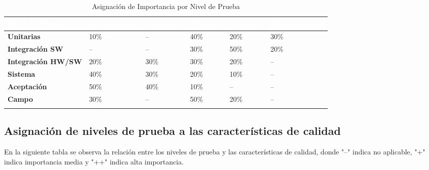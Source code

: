 \documentclass[12pt,a4paper, twosite]{article}
\begin{document}
\begin{longtable}{|p{3cm}|p{2cm}|p{2cm}|p{2cm}|p{2cm}|p{2cm}|}
  \hline
  \cellcolor[HTML]{4472C4}\textcolor{white}{\textbf{Nivel de Prueba}} & \cellcolor[HTML]{4472C4}\textcolor{white}{\textbf{Funcionalidad}} & \cellcolor[HTML]{4472C4}\textcolor{white}{\textbf{Usabilidad}} & \cellcolor[HTML]{4472C4}\textcolor{white}{\textbf{Precisión}} & \cellcolor[HTML]{4472C4}\textcolor{white}{\textbf{Eficiencia}} & \cellcolor[HTML]{4472C4}\textcolor{white}{\textbf{Mantenibilidad}} \\ \hline
  \textbf{Unitarias}          & 10\%  & –    & 40\%  & 20\%  & 30\%  \\ \hline
  \textbf{Integración SW}     & –     & –    & 30\%  & 50\%  & 20\%  \\ \hline
  \textbf{Integración HW/SW}  & 20\%  & 30\% & 30\%  & 20\%  & –     \\ \hline
  \textbf{Sistema}            & 40\%  & 30\% & 20\%  & 10\%  & –     \\ \hline
  \textbf{Aceptación}         & 50\%  & 40\% & 10\%  & –     & –     \\ \hline
  \textbf{Campo}              & 30\%  & –    & 50\%  & 20\%  & –     \\ \hline
  \caption{Asignación de Importancia por Nivel de Prueba} \label{tab:asignacion_importancia_prueba} \\
\end{longtable}

\subsection{Asignación de niveles de prueba a las características de calidad}
En la siguiente tabla se observa la relación entre los niveles de prueba y las características de calidad, donde "--" indica no aplicable, "+" indica importancia media y "++" indica alta importancia.
\end{document}
